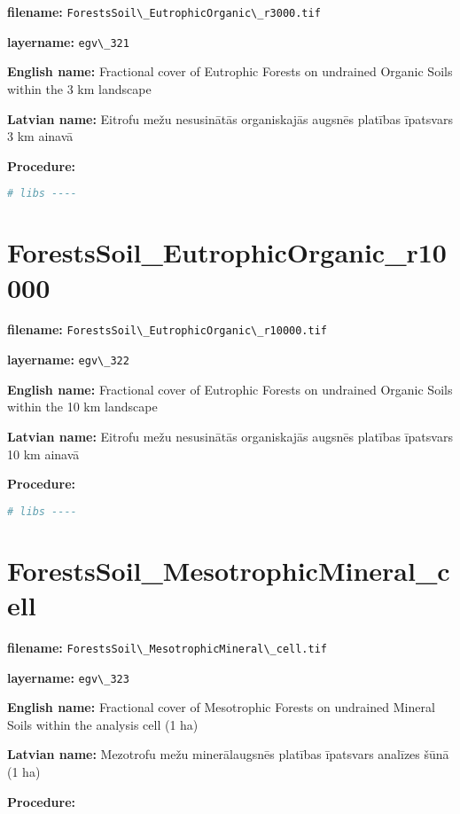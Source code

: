 \documentclass[
]{book}
\newcommand{\passthrough}[1]{#1}
\begin{document}
\textbf{filename:} \passthrough{\lstinline!ForestsSoil\_EutrophicOrganic\_r3000.tif!}

\textbf{layername:} \passthrough{\lstinline!egv\_321!}

\textbf{English name:} Fractional cover of Eutrophic Forests on undrained Organic Soils within the 3 km landscape

\textbf{Latvian name:} Eitrofu mežu nesusinātās organiskajās augsnēs platības īpatsvars 3 km ainavā

\textbf{Procedure:}

\begin{lstlisting}[language=R]
# libs ----
\end{lstlisting}

\section{ForestsSoil\_EutrophicOrganic\_r10000}\label{ch06.322}

\textbf{filename:} \passthrough{\lstinline!ForestsSoil\_EutrophicOrganic\_r10000.tif!}

\textbf{layername:} \passthrough{\lstinline!egv\_322!}

\textbf{English name:} Fractional cover of Eutrophic Forests on undrained Organic Soils within the 10 km landscape

\textbf{Latvian name:} Eitrofu mežu nesusinātās organiskajās augsnēs platības īpatsvars 10 km ainavā

\textbf{Procedure:}

\begin{lstlisting}[language=R]
# libs ----
\end{lstlisting}

\section{ForestsSoil\_MesotrophicMineral\_cell}\label{ch06.323}

\textbf{filename:} \passthrough{\lstinline!ForestsSoil\_MesotrophicMineral\_cell.tif!}

\textbf{layername:} \passthrough{\lstinline!egv\_323!}

\textbf{English name:} Fractional cover of Mesotrophic Forests on undrained Mineral Soils within the analysis cell (1 ha)

\textbf{Latvian name:} Mezotrofu mežu minerālaugsnēs platības īpatsvars analīzes šūnā (1 ha)

\textbf{Procedure:}
\end{document}
